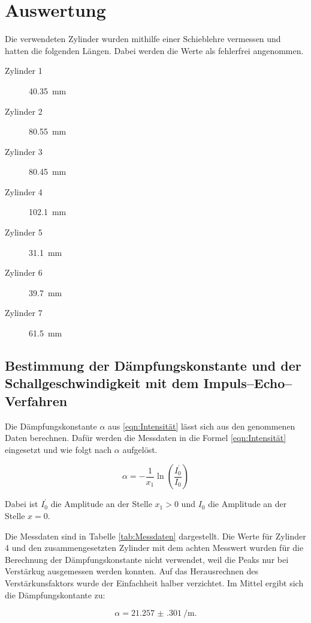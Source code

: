 \section{Auswertung}

Die verwendeten Zylinder wurden mithilfe einer Schieblehre vermessen und
hatten die folgenden Längen. Dabei werden die Werte als fehlerfrei angenommen.

\begin{description}
  \item[Zylinder 1] \SI{40,35}{\milli\meter}
  \item[Zylinder 2] \SI{80,55}{\milli\meter}
  \item[Zylinder 3] \SI{80,45}{\milli\meter}
  \item[Zylinder 4] \SI{102,1}{\milli\meter}
  \item[Zylinder 5] \SI{31,1}{\milli\meter}
  \item[Zylinder 6] \SI{39,7}{\milli\meter}
  \item[Zylinder 7] \SI{61,5}{\milli\meter}
\end{description}

\subsection{Bestimmung der Dämpfungskonstante und der Schallgeschwindigkeit mit dem Impuls--Echo--Verfahren}

Die Dämpfungskonstante $\alpha$ aus \eqref{eqn:Intensität}
lässt sich aus den genommenen Daten berechnen. Dafür werden die Messdaten
in die Formel \eqref{eqn:Intensität} eingesetzt und wie folgt nach $\alpha$ aufgelöst.

\begin{equation}
  \label{eqn:dämpfung}
  \alpha = - \frac{1}{x_1} \ln{\left(\frac{I_0^\text{'}}{I_0}\right)}
\end{equation}

Dabei ist $I_0^\text{'}$ die Amplitude an der Stelle $x_1 > 0$ und $I_0$
die Amplitude an der Stelle $x  = 0$.

Die Messdaten sind in Tabelle \ref{tab:Messdaten} dargestellt.
Die Werte für Zylinder 4 und den zusammengesetzten Zylinder mit dem
achten Messwert wurden für die Berechnung der Dämpfungskonstante nicht
verwendet, weil die Peaks nur bei Verstärkug ausgemessen werden konnten.
Auf das Herausrechnen des Verstärkunsfaktors wurde der Einfachheit halber verzichtet.
Im Mittel ergibt sich die Dämpfungskontante zu:

\begin{equation}
  \alpha = \SI{21.257(301)}{\per\meter}.
\end{equation}

